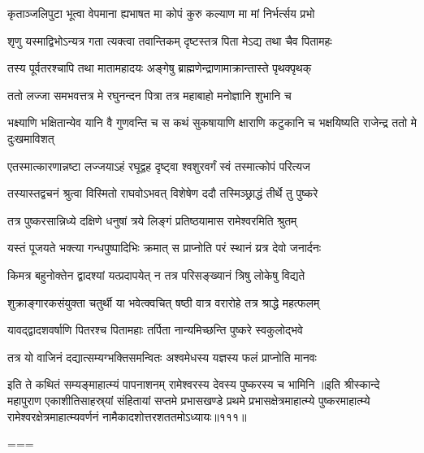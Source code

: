 \twolineshloka
{कृताञ्जलिपुटा भूत्वा वेपमाना ह्यभाषत}
{मा कोपं कुरु कल्याण मा मां निर्भर्त्सय प्रभो}%

\twolineshloka
{शृणु यस्माद्विभोऽन्यत्र गता त्यक्त्वा तवान्तिकम्}
{दृष्टस्तत्र पिता मेऽद्य तथा चैव पितामहः}%

\twolineshloka
{तस्य पूर्वतरश्चापि तथा मातामहादयः}
{अङ्गेषु ब्राह्मणेन्द्राणामाक्रान्तास्ते पृथक्पृथक्}%

\twolineshloka
{ततो लज्जा समभवत्तत्र मे रघुनन्दन}
{पित्रा तत्र महाबाहो मनोज्ञानि शुभानि च}%

\threelineshloka
{भक्ष्याणि भक्षितान्येव यानि वै गुणवन्ति च}
{स कथं सुकषायाणि क्षाराणि कटुकानि च}
{भक्षयिष्यति राजेन्द्र ततो मे दुःखमाविशत्}%

\twolineshloka
{एतस्मात्कारणान्नष्टा लज्जयाऽहं रघूद्वह}
{दृष्ट्वा श्वशुरवर्गं स्वं तस्मात्कोपं परित्यज}%

\twolineshloka
{तस्यास्तद्वचनं श्रुत्वा विस्मितो राघवोऽभवत्}
{विशेषेण ददौ तस्मिञ्छ्राद्धं तीर्थे तु पुष्करे}%

\twolineshloka
{तत्र पुष्करसान्निध्ये दक्षिणे धनुषां त्रये}
{लिङ्गं प्रतिष्ठयामास रामेश्वरमिति श्रुतम्}%

\twolineshloka
{यस्तं पूजयते भक्त्या गन्धपुष्पादिभिः क्रमात्}
{स प्राप्नोति परं स्थानं य्रत्र देवो जनार्दनः}%

\twolineshloka
{किमत्र बहुनोक्तेन द्वादश्यां यत्प्रदापयेत्}
{न तत्र परिसङ्ख्यानं त्रिषु लोकेषु विद्यते}%

\twolineshloka
{शुक्राङ्गारकसंयुक्ता चतुर्थी या भवेत्क्वचित्}
{षष्ठी वात्र वरारोहे तत्र श्राद्धे महत्फलम्}%

\twolineshloka
{यावद्द्वादशवर्षाणि पितरश्च पितामहाः}
{तर्पिता नान्यमिच्छन्ति पुष्करे स्वकुलोद्भवे}%

\twolineshloka
{तत्र यो वाजिनं दद्यात्सम्यग्भक्तिसमन्वितः}
{अश्वमेधस्य यज्ञस्य फलं प्राप्नोति मानवः}%

\twolineshloka
{इति ते कथितं सम्यङ्माहात्म्यं पापनाशनम्}
{रामेश्वरस्य देवस्य पुष्करस्य च भामिनि}%
॥इति श्रीस्कान्दे महापुराण एकाशीतिसाहस्र्यां संहितायां सप्तमे प्रभासखण्डे प्रथमे प्रभासक्षेत्रमाहात्म्ये पुष्करमाहात्म्ये रामेश्वरक्षेत्रमाहात्म्यवर्णनं नामैकादशोत्तरशततमोऽध्यायः॥१११॥

===


\vakta{}
\shrota{}
\tags{}
\notes{}


